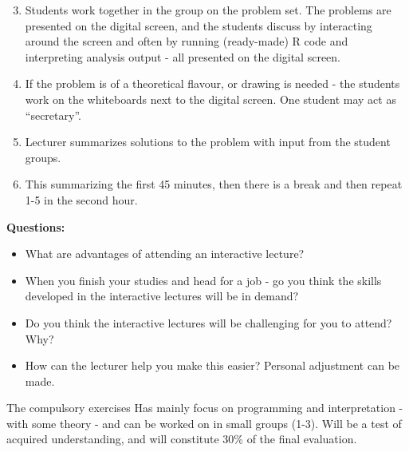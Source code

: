 \documentclass[
  ignorenonframetext,
]{beamer}
\providecommand{\tightlist}{%
  \setlength{\itemsep}{0pt}\setlength{\parskip}{0pt}}
\begin{document}
\begin{frame}
\begin{enumerate}
\setcounter{enumi}{2}
\item
  Students work together in the group on the problem set. The problems
  are presented on the digital screen, and the students discuss by
  interacting around the screen and often by running (ready-made) R code
  and interpreting analysis output - all presented on the digital
  screen.
\item
  If the problem is of a theoretical flavour, or drawing is needed - the
  students work on the whiteboards next to the digital screen. One
  student may act as ``secretary''.
\end{enumerate}
\end{frame}

\begin{frame}
\begin{enumerate}
\setcounter{enumi}{4}
\item
  Lecturer summarizes solutions to the problem with input from the
  student groups.
\item
  This summarizing the first 45 minutes, then there is a break and then
  repeat 1-5 in the second hour.
\end{enumerate}
\end{frame}

\begin{frame}
\textbf{Questions:}

\begin{itemize}
\tightlist
\item
  What are advantages of attending an interactive lecture?
\item
  When you finish your studies and head for a job - go you think the
  skills developed in the interactive lectures will be in demand?
\item
  Do you think the interactive lectures will be challenging for you to
  attend? Why?
\item
  How can the lecturer help you make this easier? Personal adjustment
  can be made.
\end{itemize}
\end{frame}

\begin{frame}
\begin{block}{The compulsory exercises}
\label{the-compulsory-exercises}
Has mainly focus on programming and interpretation - with some theory -
and can be worked on in small groups (1-3). Will be a test of acquired
understanding, and will constitute 30\% of the final evaluation.
\end{block}
\end{frame}
\end{document}
